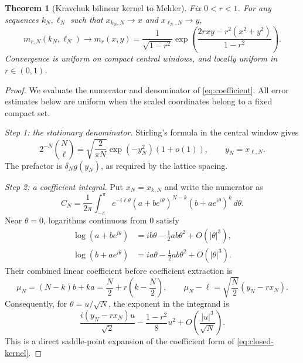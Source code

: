 \documentclass[11pt,reqno]{amsart}
\newtheorem{theorem}{Theorem}[section]
\theoremstyle{definition}
\theoremstyle{remark}
\begin{document}
\begin{theorem}[Kravchuk bilinear kernel to Mehler]\label{thm:bilinear-limit}
Fix $0<r<1$. For any sequences $k_N,\ell_N$ such that
$x_{k_N,N}\to x$ and $x_{\ell_N,N}\to y$,
\begin{equation}\label{eq:directmehler}
\boxed{\displaystyle
m_{r,N}(k_N,\ell_N)\longrightarrow
m_r(x,y)=\frac1{\sqrt{1-r^2}}
\exp\left(\frac{2rxy-r^2(x^2+y^2)}{1-r^2}\right).}
\end{equation}
Convergence is uniform on compact central windows, and locally uniform
in $r\in(0,1)$.
\end{theorem}
\begin{proof}
We evaluate the numerator and denominator of \eqref{eq:coefficient}.
All error estimates below are uniform when the scaled coordinates
belong to a fixed compact set.

\smallskip\noindent\emph{Step 1: the stationary denominator.}
Stirling's formula in the central window gives
\begin{equation}\label{eq:binomial-asym}
2^{-N}\binom N\ell
=\sqrt{\frac2{\pi N}}\exp(-y_N^2)(1+o(1)),
\qquad y_N=x_{\ell,N}.
\end{equation}
The prefactor is $\delta_Ng(y_N)$, as required by the lattice spacing.

\smallskip\noindent\emph{Step 2: a coefficient integral.}
Put $x_N=x_{k,N}$ and write the numerator as
\begin{equation}\label{eq:integral}
C_N=\frac1{2\pi}\int_{-\pi}^{\pi}
e^{-i\ell\theta}(a+be^{i\theta})^{N-k}
(b+ae^{i\theta})^k\,d\theta.
\end{equation}
Near $\theta=0$, logarithms continuous from $0$ satisfy
\[
\begin{aligned}
\log(a+be^{i\theta})&=ib\theta-\tfrac12ab\theta^2+O(|\theta|^3),\\
\log(b+ae^{i\theta})&=ia\theta-\tfrac12ab\theta^2+O(|\theta|^3).
\end{aligned}
\]
Their combined linear coefficient before coefficient extraction is
\[
\mu_N=(N-k)b+ka=\frac N2+r\left(k-\frac N2\right),
\qquad
\mu_N-\ell=\sqrt{\frac N2}(y_N-rx_N).
\]
Consequently, for $\theta=u/\sqrt N$, the exponent in the integrand is
\begin{equation}\label{eq:local-exponent}
\frac{i(y_N-rx_N)u}{\sqrt2}
-\frac{1-r^2}{8}u^2+O\left(\frac{|u|^3}{\sqrt N}\right).
\end{equation}
This is a direct saddle-point expansion of the coefficient form of
\eqref{eq:closed-kernel}.


\end{proof}
\end{document}

